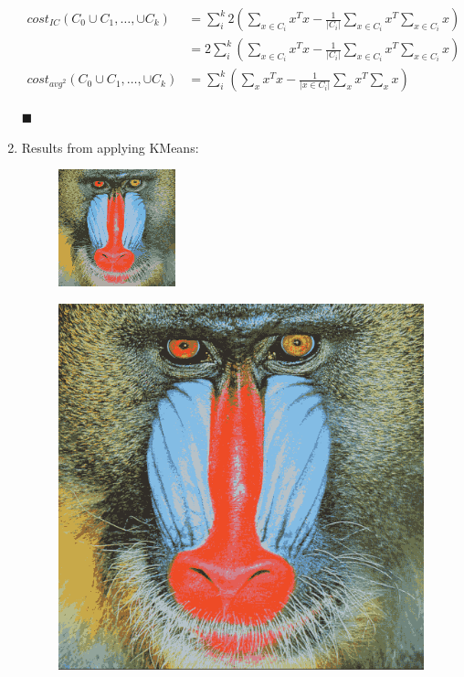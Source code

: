 \documentclass{article}
\begin{document}
\begin{enumerate}
\begin{align*}
  cost_{IC}(C_0 \cup C_1,\dots,\cup C_k) &= \sum\limits_i^k 2(\sum\limits_{x \in C_i} x^Tx - \frac 1 {|C_i|} \sum\limits_{x \in C_i} x^T \sum\limits_{x \in C_i} x)\\
  &= 2\sum\limits_i^k(\sum\limits_{x \in C_i} x^Tx - \frac 1 {|C_i|} \sum\limits_{x \in C_i} x^T \sum\limits_{x \in C_i} x)\\
  cost_{avg^2}(C_0 \cup C_1,\dots,\cup C_k) &= \sum\limits_i^k(\sum\limits_{x} x^Tx - \frac 1 {|{x \in C_i}|} \sum\limits_{x} x^T \sum\limits_{x} x)
\end{align*}

$\blacksquare$

\item Results from applying KMeans:

\begin{figure}[H]
  \includegraphics{../output/small.png}
\end{figure}
\begin{figure}[H]
\includegraphics{../output/large.png}
\end{figure}


\end{enumerate}
\end{document}
